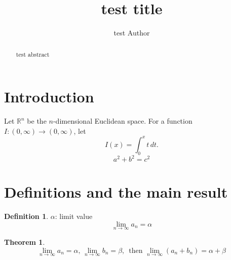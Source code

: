 \documentclass[12pt, leqno, twoside]{article}
\numberwithin{equation}{section}
\newtheorem{thm}{Theorem}[section]
\theoremstyle{definition}
\newtheorem{defn}{Definition}[section]
\theoremstyle{remark}
\newcommand{\R}{\mathbb{R}}
\begin{document}
\baselineskip=18pt

\title{
test title
}
\author{test Author}

\maketitle

\begin{abstract}
test abstract
\end{abstract}

\section{Introduction}\label{sec:intro}

Let $\R^n$ be the $n$-dimensional Euclidean space.
For a function $I:(0,\infty)\to(0,\infty)$, let
\begin{equation}\label{test}
	I(x) = \int_{0}^{x} t \,dt.
\end{equation}
\begin{equation*}
a^2 + b^2 = c^2
\end{equation*}


\section{Definitions and the main result}\label{sec:main}

\begin{defn}
$\alpha$: limit value
\[
     \lim_{n \to \infty} a_{n} = \alpha
\]
\end{defn}
\begin{thm}
\[
     \lim_{n \to \infty} a_{n} = \alpha,\,
     \lim_{n \to \infty} b_{n} = \beta,\,\text{ then }
     \lim_{n \to \infty} (a_{n} + b_{n}) = \alpha + \beta
\]
\end{thm}
\end{document}
